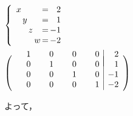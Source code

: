 \documentclass[a4paper,10pt,onecolumn,oneside,notitlepage,final]{jsarticle} %
\begin{document}
\begin{CKdata}
\begin{edaenumerate}
\item\ 
$\left\{\begin{array}{r@{\,}r@{\,}r@{\,}r@{\,=\,}r}
  x&    &    &    &  2\\
   &   y&    &    &  1\\
   &    &   z&    & -1\\
   &    &    &   w& -2
\end{array}\right.$
\item\ 
$\left(\begin{array}{rrrr|r}
\hspace{6mm}&\hspace{6mm}&\hspace{6mm}&\hspace{6mm}\\[-7mm]
  1&   0&   0&   0&  2\\
  0&   1&   0&   0&  1\\
  0&   0&   1&   0& -1\\
  0&   0&   0&   1& -2
\end{array}\right)$\\

\item\ \qquad よって，\item\ 
\end{edaenumerate}


\end{CKdata}
\closetxt%

\renewcommand{\ctoi}{Ckeep} %
\renewcommand{\ckai}{Cmagenta} %
\printdoc %
\end{document}
